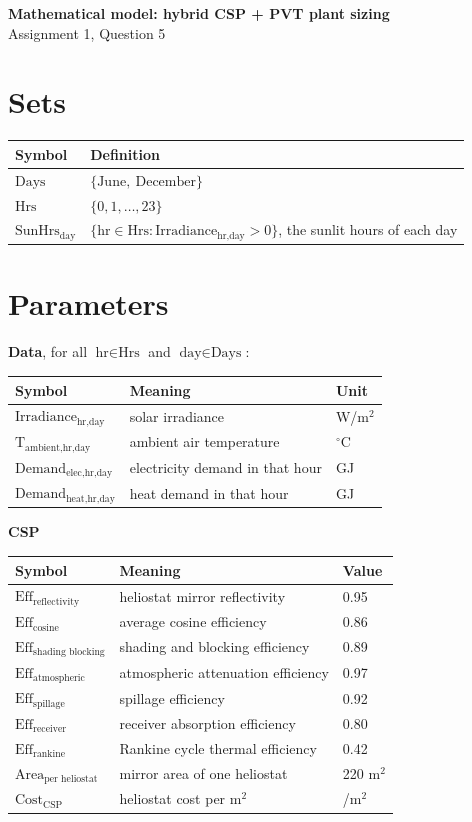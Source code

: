 \documentclass[11pt,a4paper]{article}
\newcommand{\T}[1]{\text{#1}}
\begin{document}
{\Large\bfseries Mathematical model: hybrid CSP + PVT plant sizing}\\[2pt]
{\small Assignment 1, Question 5}
\vspace{6pt}

\section{Sets}
\begin{tabular}{@{}ll@{}}
\toprule
Symbol & Definition\\\midrule
$\T{Days}$ & $\{\T{June},\ \T{December}\}$\\
$\T{Hrs}$ & $\{0,1,\dots,23\}$\\
$\T{SunHrs}_{\T{day}}$ & $\{\T{hr}\in\T{Hrs} : \T{Irradiance}_{\T{hr,day}}>0\}$, the sunlit hours of each day\\
\bottomrule
\end{tabular}

\section{Parameters}
\textbf{Data}, for all $\T{hr}\in\T{Hrs}$ and $\T{day}\in\T{Days}$:\\[2pt]
\begin{tabular}{@{}lll@{}}
\toprule
Symbol & Meaning & Unit\\\midrule
$\T{Irradiance}_{\T{hr,day}}$ & solar irradiance & W/m$^2$\\
$\T{T}_{\T{ambient,hr,day}}$ & ambient air temperature & $^\circ$C\\
$\T{Demand}_{\T{elec,hr,day}}$ & electricity demand in that hour & GJ\\
$\T{Demand}_{\T{heat,hr,day}}$ & heat demand in that hour & GJ\\
\bottomrule
\end{tabular}

\vspace{6pt}\textbf{CSP}\\[2pt]
\begin{tabular}{@{}lll@{}}
\toprule
Symbol & Meaning & Value\\\midrule
$\T{Eff}_{\T{reflectivity}}$ & heliostat mirror reflectivity & 0.95\\
$\T{Eff}_{\T{cosine}}$ & average cosine efficiency & 0.86\\
$\T{Eff}_{\T{shading blocking}}$ & shading and blocking efficiency & 0.89\\
$\T{Eff}_{\T{atmospheric}}$ & atmospheric attenuation efficiency & 0.97\\
$\T{Eff}_{\T{spillage}}$ & spillage efficiency & 0.92\\
$\T{Eff}_{\T{receiver}}$ & receiver absorption efficiency & 0.80\\
$\T{Eff}_{\T{rankine}}$ & Rankine cycle thermal efficiency & 0.42\\
$\T{Area}_{\T{per heliostat}}$ & mirror area of one heliostat & 220 m$^2$\\
$\T{Cost}_{\T{CSP}}$ & heliostat cost per m$^2$ & \texteuro80/m$^2$\\
\bottomrule
\end{tabular}
\end{document}
